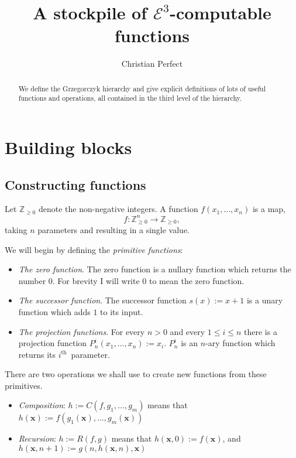 \documentclass[a4paper]{article}
\newcommand{\grz}[1]{$\mathcal{E}^{#1}$}	%
\newcommand{\ZZ}{\mathbb{Z}}
\newcommand{\ith}{$i^{\textrm{th}}$~}
\newcommand{\xvec}{\mathbf{x}}	%
\theoremstyle{plain}
\theoremstyle{definition}
\begin{document}
\title{A stockpile of \grz{3}-computable functions}
\author{Christian Perfect}
\maketitle

\begin{abstract}
	We define the Grzegorczyk hierarchy and give explicit definitions of lots of useful functions and operations, all contained in the third level of the hierarchy.
\end{abstract}

\section{Building blocks}

\subsection{Constructing functions}
Let $\ZZ_{\geq 0}$ denote the non-negative integers. A function $f(x_1, \dots, x_n)$ is a map,
\[f: \ZZ_{\geq 0}^n \rightarrow \ZZ_{\geq 0},\]
taking $n$ parameters and resulting in a single value.

We will begin by defining the {\it primitive functions}:

\begin{itemize}
	\item {\em The zero function}. The zero function is a nullary function which returns the number $0$. For brevity I will write $0$ to mean the zero function.
	\item {\em The successor function}. The successor function $s(x) := x + 1$ is a unary function which adds $1$ to its input.
	\item {\em The projection functions}. For every $n > 0 $ and every $1 \leq i \leq n$ there is a projection function $P_n^i(x_1, \dots, x_n) := x_i$. $P_n^i$ is an $n$-ary function which returns its \ith parameter.
\end{itemize}

There are two operations we shall use to create new functions from these primitives.

\begin{itemize}
	\item {\em Composition}: $h := C(f,g_1,\dots,g_m)$ means that $h(\xvec) := f(g_1(\xvec),\dots,g_m(\xvec))$
	\item {\em Recursion}: $h := R(f,g)$ means that $h(\xvec,0) := f(\xvec)$, and $h(\xvec,n+1) := g(n,h(\xvec,n),\xvec)$
\end{itemize}
\end{document}
